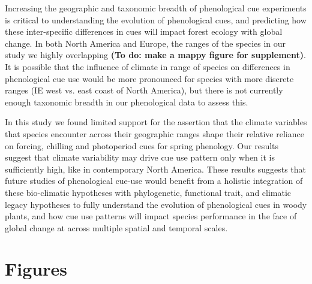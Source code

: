 \documentclass[12pt]{article}
\begin{document}
Increasing the geographic and taxonomic breadth of phenological cue experiments is critical to understanding the evolution of phenological cues, and predicting how these inter-specific differences in cues will impact forest ecology with global change. In both North America and Europe, the ranges of the species in our study we highly overlapping \textbf{(To do: make a mappy figure for supplement)}. It is possible that the influence of climate in range of species on differences in phenological cue use would be more pronounced for species with more discrete ranges (IE west vs. east coast of North America), but there is not currently enough taxonomic breadth in our phenological data to assess this. 

In this study we found limited support for the assertion that the climate variables that species encounter across their geographic ranges shape their relative reliance on forcing, chilling and photoperiod cues for spring phenology. Our results suggest that climate variability may drive cue use pattern only when it is sufficiently high, like in contemporary North America. These results suggests that future studies of phenological cue-use would benefit from a holistic integration of these bio-climatic hypotheses with phylogenetic, functional trait, and climatic legacy hypotheses to fully understand the evolution of phenological cues in woody plants, and how cue use patterns will impact species performance in the face of global change at across multiple spatial and temporal scales. %


\section*{Figures}
\end{document}
